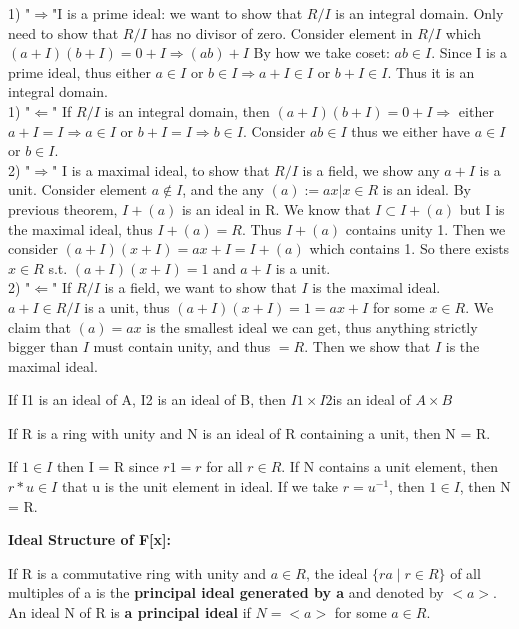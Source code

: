 \documentclass{article}
\begin{document}
\begin{Proof}
   1) "$\Rightarrow$"I is a prime ideal: we want to show that $R/I$ is an integral domain. Only need to show that $R/I$ has no divisor of zero.
   Consider element in $R/I$ which $(a+I)(b+I) = 0 + I \Rightarrow (ab) + I$  By how we take coset: $ab \in I$. Since I is a prime ideal, thus either $a \in I $ or $b \in I \Rightarrow a + I \in I $ or $b + I \in I$. Thus it is an integral domain.
\\ 1) "$\Leftarrow$" If $R/I$ is an integral domain, then $(a+I)(b+I) = 0 + I \Rightarrow $ either $a+I = I \Rightarrow a \in I$ or $b + I = I\Rightarrow b \in I $. Consider $ab \in I$ thus we either have $a \in I $ or $b \in I$.
\\2) "$\Rightarrow$" I is a maximal ideal, to show that $R/I$ is a field, we show any $a + I$ is a unit. Consider element $a \notin I$, and the any $(a) := {ax| x \in R}$ is an ideal. By previous theorem, $I + (a)$ is an ideal in R. We know that $I \subset I +(a)$ but I is the maximal ideal, thus $I + (a) = R$. Thus $ I + (a)$ contains unity 1.  Then we consider $(a+I)(x+I) = ax + I = I + (a)$ which contains 1. So there exists $x \in R$ s.t. $(a+I)(x+I) = 1$ and $a + I$ is  a unit.
\\2) "$\Leftarrow$" If $R/I$ is a field, we want to show that $I$ is the maximal ideal. $a + I \in R/I$ is a unit, thus $(a+I)(x+I) = 1 = ax + I$ for some $x\in R$. We claim that $(a) = ax$ is the smallest ideal we can get, thus anything strictly bigger than $I$ must contain unity, and thus $ = R$. Then we show that $I$ is the maximal ideal.

\end{Proof}
\begin{note}
    If I1 is an ideal of A, I2 is an ideal of B, then $I1 \times I2$is an ideal of $A \times B$
\end{note}
\begin{theorem}
    If R is a ring with unity and N is an ideal of R containing a unit, then N = R.
\end{theorem}
\begin{Proof}
If $1 \in I$ then I = R since $r1 = r$ for all $r \in R$. If N contains a unit element, then $r*u \in I$ that u is the unit element in ideal. If we take $r = u^{-1}$, then $1 \in I$, then N = R.
\end{Proof}
\textbf{Ideal Structure of F[x]:}
\begin{Def}
    If R is a commutative ring with unity and $a \in R$, the ideal $\{ra \mid r \in R\}$  of all multiples of a is the \textbf{principal ideal generated by a} and denoted by $<a>$. An ideal N of R is \textbf{a principal ideal} if $N = <a>$ for some $a \in R$.
\end{Def}
\end{document}
